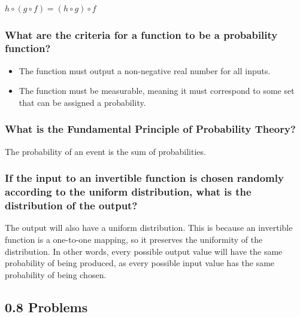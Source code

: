 \documentclass[
  letterpaper,
  DIV=11,
  numbers=noendperiod]{scrartcl}
\providecommand{\tightlist}{%
  \setlength{\itemsep}{0pt}\setlength{\parskip}{0pt}}\usepackage{longtable,booktabs,array}
\begin{document}
\(h \circ (g \circ f) = (h \circ g) \circ f\)

\hypertarget{what-are-the-criteria-for-a-function-to-be-a-probability-function}{%
\subsubsection{What are the criteria for a function to be a probability
function?}\label{what-are-the-criteria-for-a-function-to-be-a-probability-function}}

\begin{itemize}
\tightlist
\item
  The function must output a non-negative real number for all inputs.
\item
  The function must be measurable, meaning it must correspond to some
  set that can be assigned a probability.
\end{itemize}

\hypertarget{what-is-the-fundamental-principle-of-probability-theory}{%
\subsubsection{What is the Fundamental Principle of Probability
Theory?}\label{what-is-the-fundamental-principle-of-probability-theory}}

The probability of an event is the sum of probabilities.

\hypertarget{if-the-input-to-an-invertible-function-is-chosen-randomly-according-to-the-uniform-distribution-what-is-the-distribution-of-the-output}{%
\subsubsection{If the input to an invertible function is chosen randomly
according to the uniform distribution, what is the distribution of the
output?}\label{if-the-input-to-an-invertible-function-is-chosen-randomly-according-to-the-uniform-distribution-what-is-the-distribution-of-the-output}}

The output will also have a uniform distribution. This is because an
invertible function is a one-to-one mapping, so it preserves the
uniformity of the distribution. In other words, every possible output
value will have the same probability of being produced, as every
possible input value has the same probability of being chosen.

\hypertarget{problems}{%
\subsection{0.8 Problems}\label{problems}}
\end{document}
